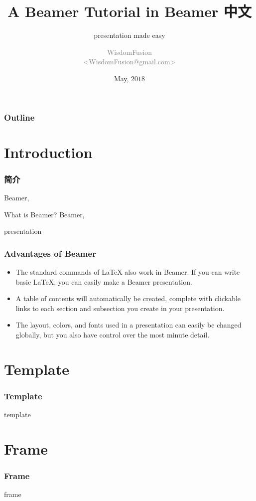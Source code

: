 \documentclass[aspectratio=169,utf8]{ctexbeamer}
\title[Beamer Tutorial]{
  A Beamer Tutorial in Beamer 中文
}
\subtitle{presentation made easy}
\author[WisdomFusion]{
  \scriptsize \textcolor{gray}{WisdomFusion\\ <WisdomFusion@gmail.com>}
}
\date{May, $2018$}
\begin{document}
\addtocounter{framenumber}{-1}


\begin{frame}
  \titlepage
\end{frame}

\begin{frame}
  \frametitle{Outline}
  \tableofcontents
\end{frame}


\section*{Introduction}
\begin{frame}[t]
  \frametitle{简介}

  Beamer,
  
  \begin{block}{What is Beamer?}
    Beamer,
  \end{block}

  presentation
  
\end{frame}


\begin{frame}
  \frametitle{Advantages of Beamer}

  \begin{itemize}
    \item The standard commands of \LaTeX{} also work in Beamer. If you can write basic \LaTeX{}, you can easily make a Beamer presentation.
    \item A table of contents will automatically be created, complete with clickable links to each section and subsection you create in your presentation.
    \item The layout, colors, and fonts used in a presentation can easily be changed globally, but you also have control over the most minute detail.
  \end{itemize}
  
\end{frame}

\section*{Template}
\begin{frame}
  \frametitle{Template}

  template

\end{frame}

\section*{Frame}
\begin{frame}
  \frametitle{Frame}

  frame
\end{frame}
\end{document}
